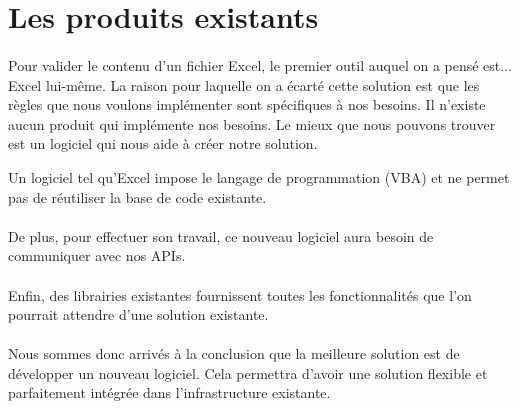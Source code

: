 \section{Les produits existants}
\label{sec:existing-products}

\paragraph{}
Pour valider le contenu d'un fichier Excel, le premier outil auquel on a pensé est... Excel lui-même.
La raison pour laquelle on a écarté cette solution est que les règles que nous voulons implémenter sont spécifiques à nos besoins.
Il n'existe aucun produit qui implémente nos besoins.
Le mieux que nous pouvons trouver est un logiciel qui nous aide à créer notre solution.

Un logiciel tel qu’Excel impose le langage de programmation (VBA) et ne permet pas de réutiliser la base de code existante.

\paragraph{}
De plus, pour effectuer son travail, ce nouveau logiciel aura besoin de communiquer avec nos APIs.

\paragraph{}
Enfin, des librairies existantes fournissent toutes les fonctionnalités que l'on pourrait attendre d'une solution existante.

\paragraph{}
Nous sommes donc arrivés à la conclusion que la meilleure solution est de développer un nouveau logiciel.
Cela permettra d'avoir une solution flexible et parfaitement intégrée dans l'infrastructure existante.
